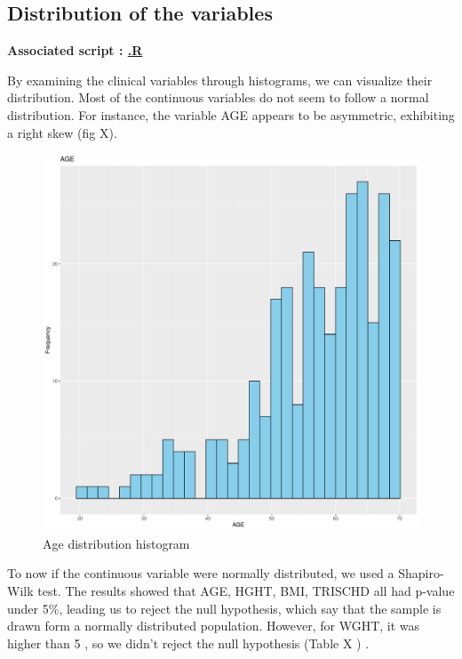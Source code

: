 \documentclass[a4paper, 11pt]{article}
\begin{document}
\begin{multicols}{2}
\subsection{Distribution of the variables}

\begin{scriptsize}	
	
	\textbf{Associated script : \href{https://github.com/leopoldguyot/BINF-F401-Project/*}{.R}}
\end{scriptsize}

By examining the clinical variables through histograms, we can visualize their distribution. Most of the continuous variables do not seem to follow a normal distribution. For instance, the variable AGE appears to be asymmetric, exhibiting a right skew (fig X).

\begin{figure}[H]
	\centering
	\includegraphics[width=\columnwidth]{figures/clinical_data_var_dist/AGE}
	\caption{Age distribution histogram }
	\label{fig:corCircle}
\end{figure}

To now if the continuous variable were normally distributed, we used a Shapiro-Wilk test. The results showed that AGE, HGHT, BMI, TRISCHD all had p-value under 5\%, leading us to reject the null hypothesis, which say that the sample is drawn form a normally distributed population. However, for WGHT, it was higher than 5 , so we didn’t reject the null hypothesis (Table X ) . 


\end{multicols}
\end{document}
